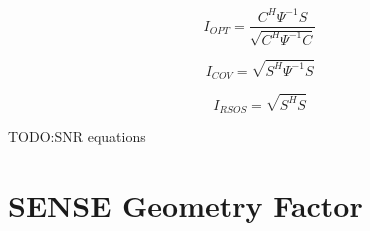 \begin{equation} \label{eq:I_OPT}
I_{OPT}=\frac{C^H\Psi^{-1}S}{\sqrt{C^H\Psi^{-1}C}}
\end{equation}

\begin{equation} \label{eq:I_COV}
I_{COV}=\sqrt{S^H\Psi^{-1}S}
\end{equation}

\begin{equation} \label{eq:I_RSOS}
I_{RSOS}=\sqrt{S^{H} S}
\end{equation}

TODO:SNR equations

\section{SENSE Geometry Factor}
